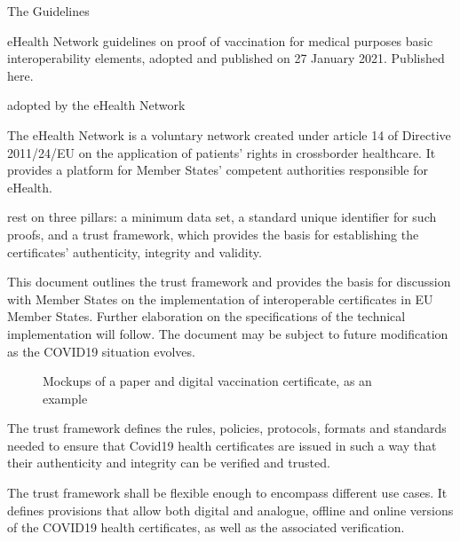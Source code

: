 \documentclass[a4paper,12pt,english]{sphinxhowto}
\begin{document}
\sphinxAtStartPar
The Guidelines%
\begin{footnote}[2]\sphinxAtStartFootnote
eHealth Network guidelines on proof of vaccination for medical purposes \sphinxhyphen{} basic interoperability elements, adopted and published on 27 January 2021. Published here.
%
\end{footnote} adopted by the eHealth Network%
\begin{footnote}[3]\sphinxAtStartFootnote
The eHealth Network is a voluntary network created under article 14 of Directive 2011/24/EU on the application of patients’ rights in cross\sphinxhyphen{}border healthcare. It provides a platform for Member States’ competent authorities responsible for eHealth.
%
\end{footnote} rest on three pillars: a minimum data set, a standard unique identifier for such proofs, and a trust framework, which provides the basis for establishing the certificates’ authenticity, integrity and validity.

\sphinxAtStartPar
This document outlines the trust framework and provides the basis for discussion with Member States on the implementation of interoperable certificates in EU Member States. Further elaboration on the specifications of the technical implementation will follow. The document may be subject to future modification as the COVID\sphinxhyphen{}19 situation evolves.

\begin{figure}[htbp]
\centering
\capstart

\noindent{}
\caption{Mock\sphinxhyphen{}ups of a paper and digital vaccination certificate, as an example}\label{\detokenize{ssi/annotehealth:id7}}\end{figure}

\sphinxAtStartPar
The trust framework defines the rules, policies, protocols, formats and standards needed to ensure that Covid\sphinxhyphen{}19 health certificates are issued in such a way that their authenticity and integrity can be verified and trusted.

\sphinxAtStartPar
The trust framework shall be flexible enough to encompass different use cases. It defines provisions that allow both digital and analogue, off\sphinxhyphen{}line and on\sphinxhyphen{}line versions of the COVID\sphinxhyphen{}19 health certificates, as well as the associated verification.
\end{document}
